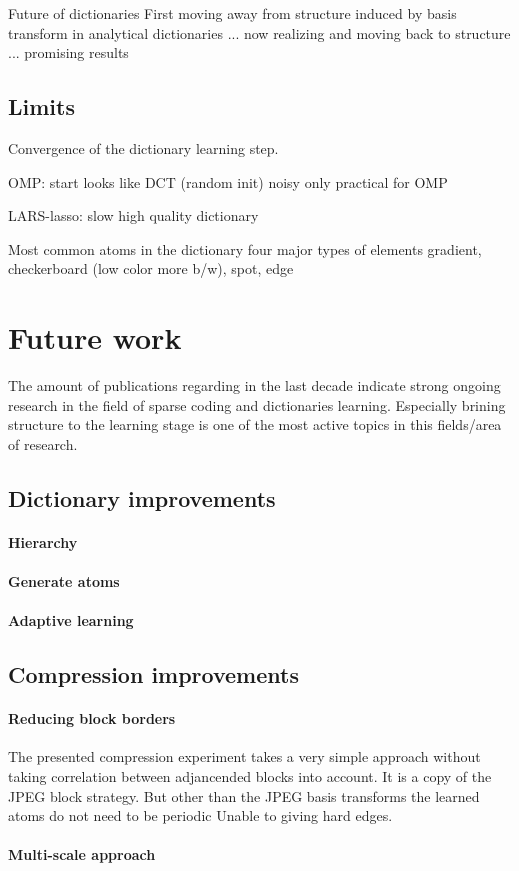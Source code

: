 Future of dictionaries
First moving away from structure induced by basis transform in analytical
dictionaries ... now realizing and moving back to structure ... promising
results\cite{?,?,?}



\subsection*{Limits}
Convergence of the dictionary learning step.

OMP:
  start looks like DCT (random init)
  noisy
  only practical for OMP

LARS-lasso:
  slow 
  high quality dictionary

  Most common atoms in the dictionary 
  four major types of elements
  gradient, checkerboard (low color more b/w), spot, edge

\section{Future work}
The amount of publications regarding in
the last decade indicate strong ongoing research in the field of sparse coding
and dictionaries learning. Especially brining structure to the learning stage is
one of the most active topics in this fields/area of research. 

\subsection{Dictionary improvements}
\paragraph{Hierarchy}
\paragraph{Generate atoms}
\paragraph{Adaptive learning}

\subsection{Compression improvements}
\paragraph{Reducing block borders} The presented compression experiment
takes a very simple approach without taking correlation between adjancended
blocks into account. It is a copy of the JPEG block strategy. But other than
the JPEG basis transforms the learned atoms do not need to be periodic
Unable to giving
hard edges. 


\paragraph{Multi-scale approach}

